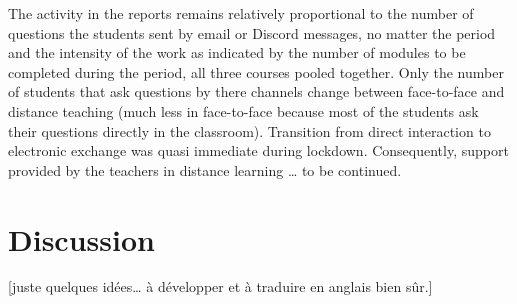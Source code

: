 \documentclass[
]{article}
\begin{document}
The activity in the reports remains relatively proportional to the
number of questions the students sent by email or Discord messages, no
matter the period and the intensity of the work as indicated by the
number of modules to be completed during the period, all three courses
pooled together. Only the number of students that ask questions by there
channels change between face-to-face and distance teaching (much less in
face-to-face because most of the students ask their questions directly
in the classroom). Transition from direct interaction to electronic
exchange was quasi immediate during lockdown. Consequently, support
provided by the teachers in distance learning \ldots{} to be continued.

\hypertarget{discussion}{%
\section{Discussion}\label{discussion}}

{[}juste quelques idées\ldots{} à développer et à traduire en anglais
bien sûr.{]}
\end{document}
